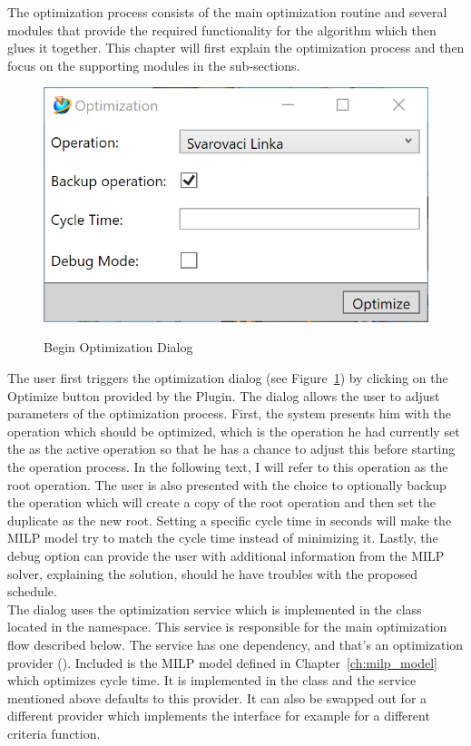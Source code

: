 The optimization process consists of the main optimization routine and several modules that provide the required functionality for the algorithm which then glues it together. This chapter will first explain the optimization process and then focus on the supporting modules in the sub-sections. \\

\begin{figure}[ht]
	\caption{Begin Optimization Dialog}
	\centering
	\includegraphics{dialog_beginoptimization}
	\label{fig:DialogBeginOptimization}
\end{figure}

The user first triggers the optimization dialog (see Figure~\ref{fig:DialogBeginOptimization}) by clicking on the Optimize button provided by the Plugin. 
The dialog allows the user to adjust parameters of the optimization process. 
First, the system presents him with the operation which should be optimized, which is the operation he had currently set the as the active operation so that he has a chance to adjust this before starting the operation process. In the following text, I will refer to this operation as the root operation.
The user is also presented with the choice to optionally backup the operation which will create a copy of the root operation and then set the duplicate as the new root.
Setting a specific cycle time in seconds will make the MILP model try to match the cycle time instead of minimizing it.
Lastly, the debug option can provide the user with additional information from the MILP solver, explaining the solution, should he have troubles with the proposed schedule. \\

The dialog uses the optimization service which is implemented in the  class located in the  namespace. This service is responsible for the main optimization flow described below. The service has one dependency, and that's an optimization provider (). Included is the MILP model defined in Chapter~\ref{ch:milp_model} which optimizes cycle time. It is implemented in the  class and the service mentioned above defaults to this provider. It can also be swapped out for a different provider which implements the  interface for example for a different criteria function. \\

